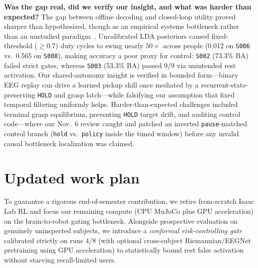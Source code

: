 \documentclass{article}
\begin{document}
\textbf{Was the gap real, did we verify our insight, and what was harder than expected?} The gap between offline decoding and closed-loop utility proved sharper than hypothesized, though as an empirical systems bottleneck rather than an unstudied paradigm~\citep{akinola2017,carrara2023}. Uncalibrated LDA posteriors caused fixed-threshold ($\ge\!0.7$) duty cycles to swing nearly $50\times$ across people (0.012 on \texttt{S006} vs.\ 0.565 on \texttt{S008}), making accuracy a poor proxy for control: \texttt{S002} (73.3\% BA) failed strict gates, whereas \texttt{S003} (53.3\% BA) passed 9/9 via unintended rest activation. Our shared-autonomy insight is verified in bounded form---binary EEG replay can drive a learned pickup skill once mediated by a recurrent-state-preserving \texttt{HOLD} and grasp latch---while falsifying our assumption that fixed temporal filtering uniformly helps. Harder-than-expected challenges included terminal grasp equilibrium, preventing \texttt{HOLD} target drift, and auditing control code---where our Nov.~6 review caught and patched an inverted \texttt{pause}-matched control branch (\texttt{hold} vs.\ \texttt{policy} inside the timed window) before any invalid causal bottleneck localization was claimed.

\section{Updated work plan}

To guarantee a rigorous end-of-semester contribution, we retire from-scratch Isaac Lab RL and focus our remaining compute (CPU MuJoCo plus GPU acceleration) on the brain-to-robot gating bottleneck. Alongside prospective evaluation on genuinely uninspected subjects, we introduce a \emph{conformal risk-controlling gate} calibrated strictly on runs 4/8 (with optional cross-subject Riemannian/EEGNet pretraining using GPU acceleration) to statistically bound rest false activation without starving recall-limited users.
\end{document}
